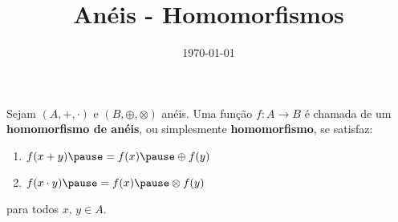 \documentclass{beamer}
\title{An\'eis - Homomorfismos}
\author[\autor]{\autor}
\institute[\instituto]{\instituto}
\date{\today}
\begin{document}
    \begin{frame}
        \maketitle
    \end{frame}

    
    \begin{frame}
        \begin{definicao}
            Sejam $(A, +, \cdot)$ \pause e $(B, \oplus, \otimes)$ \pause an\'eis. \pause Uma fun{\c c}{\~a}o $f : A \to B$ \pause \'e chamada de um \textbf{homomorfismo de an\'eis}, \pause ou simplesmente \textbf{homomorfismo}, \pause se satisfaz:\pause
            \begin{enumerate}[label={\roman*})]
                \item $f(x + y) \pause = f(x) \pause \oplus f(y)$\pause

                \vspace{.5cm}
                
                \item $f(x \cdot y) \pause = f(x) \pause \otimes f(y)$\pause
                
                \vspace{.5cm}
            \end{enumerate}
            para todos $x$, $y \in A$.\pause
        \end{definicao}
    \end{frame}
\end{document}
